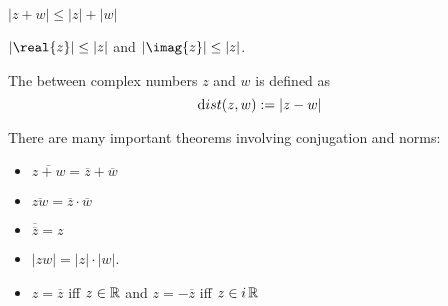 \documentclass[notes]{subfiles}
\begin{document}
\begin{theorem}
$    |z + w| \le |z| + |w|$
\end{theorem}

\begin{cor}
    $|\real{z}| \le |z|$ and $|\imag{z}| \le |z|$.
\end{cor}

\begin{definition}
    The  between complex numbers $z$ and $w$ is defined as
    \[ {\text dist}(z,w) := |z - w| \]
\end{definition}

\noindent
There are many important theorems involving conjugation and norms:
\begin{itemize}
    \item $\overline{z+w} = \overline{z} + \overline{w}$

    \item $\overline{zw} = \overline{z} \cdot \overline{w}$

    \item $\overline{\overline{z}} = z$

    \item $|zw| = |z| \cdot |w|$.

    \item $z = \overline{z}$ iff $z \in \operatorname{\mathbb{R}}$ and $z = -\overline{z}$ iff $z \in i\operatorname{\mathbb{R}}$
\end{itemize}
\end{document}
